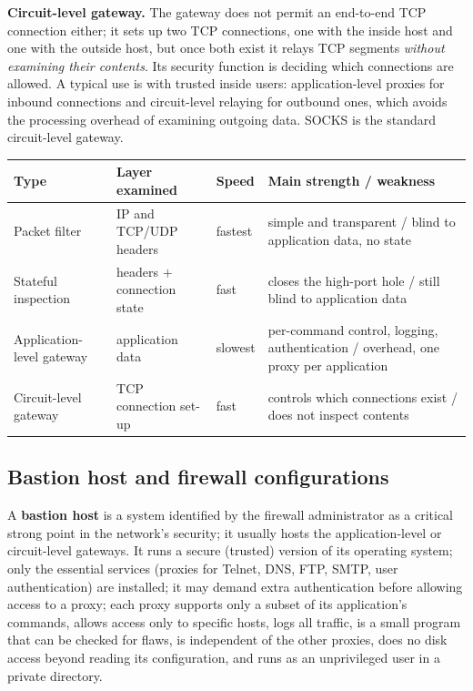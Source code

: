 \textbf{Circuit-level gateway.} The gateway does not permit an end-to-end TCP connection either; it sets up two TCP connections, one with the inside host and one with the outside host, but once both exist it relays TCP segments \emph{without examining their contents}. Its security function is deciding which connections are allowed. A typical use is with trusted inside users: application-level proxies for inbound connections and circuit-level relaying for outbound ones, which avoids the processing overhead of examining outgoing data. SOCKS is the standard circuit-level gateway.
\begin{center}\small
\begin{tabularx}{\textwidth}{@{}l l l >{\raggedright\arraybackslash}X@{}}
\toprule
Type & Layer examined & Speed & Main strength / weakness\\
\midrule
Packet filter & IP and TCP/UDP headers & fastest & simple and transparent / blind to application data, no state\\
Stateful inspection & headers $+$ connection state & fast & closes the high-port hole / still blind to application data\\
Application-level gateway & application data & slowest & per-command control, logging, authentication / overhead, one proxy per application\\
Circuit-level gateway & TCP connection set-up & fast & controls which connections exist / does not inspect contents\\
\bottomrule
\end{tabularx}
\end{center}

\subsection{Bastion host and firewall configurations \hot\new}

A \textbf{bastion host} is a system identified by the firewall administrator as a critical strong point in the network's security; it usually hosts the application-level or circuit-level gateways. It runs a secure (trusted) version of its operating system; only the essential services (proxies for Telnet, DNS, FTP, SMTP, user authentication) are installed; it may demand extra authentication before allowing access to a proxy; each proxy supports only a subset of its application's commands, allows access only to specific hosts, logs all traffic, is a small program that can be checked for flaws, is independent of the other proxies, does no disk access beyond reading its configuration, and runs as an unprivileged user in a private directory.

